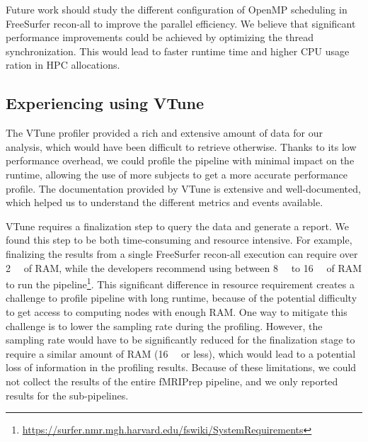 \documentclass[conference]{IEEEtran}
\begin{document}
Future work should study the different configuration of OpenMP scheduling in FreeSurfer recon-all to improve the parallel efficiency. We believe that significant performance improvements could be achieved by optimizing the thread synchronization. This would lead to faster runtime time and higher CPU usage ration in HPC allocations.

\subsection{Experiencing using VTune}
The VTune profiler provided a rich and extensive amount of data for our analysis, which would have been difficult to retrieve otherwise. Thanks to its low performance overhead, we could profile the pipeline with minimal impact on the runtime, allowing the use of more subjects to get a more accurate performance profile. The documentation provided by VTune is extensive and well-documented, which helped us to understand the different metrics and events available.

VTune requires a finalization step to query the data and generate a report. We found this step to be both time-consuming and resource intensive. For example, finalizing the results from a single FreeSurfer recon-all execution can require over \SI{2}{\tera\byte} of RAM, while the developers recommend using between \SI{8}{\giga\byte} to \SI{16}{\giga\byte} of RAM to run the pipeline\footnote{\href{https://surfer.nmr.mgh.harvard.edu/fswiki/SystemRequirements}{https://surfer.nmr.mgh.harvard.edu/fswiki/SystemRequirements}}. This significant difference in resource requirement creates a challenge to profile pipeline with long runtime, because of the potential difficulty to get access to computing nodes with enough RAM. One way to mitigate this challenge is to lower the sampling rate during the profiling. However, the sampling rate would have to be significantly reduced for the finalization stage to require a similar amount of RAM (\SI{16}{\giga\byte} or less), which would lead to a potential loss of information in the profiling results. Because of these limitations, we could not collect the results of the entire fMRIPrep pipeline, and we only reported results for the sub-pipelines.
\end{document}
